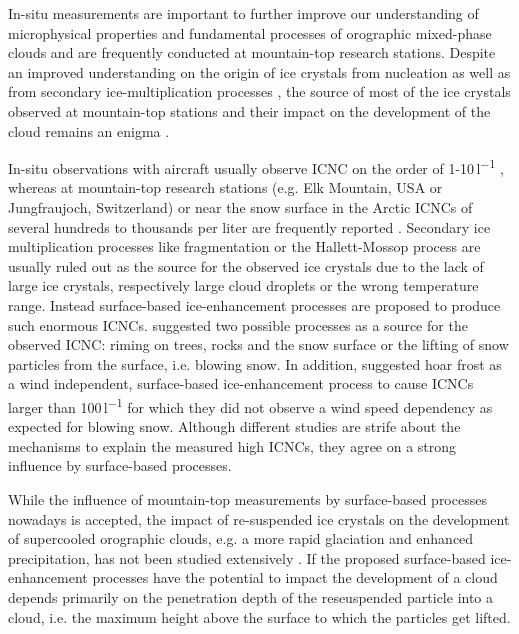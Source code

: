 \documentclass[draft,linenumbers]{agujournal}
\begin{document}
In-situ measurements are important to further improve our understanding of microphysical properties and fundamental processes of orographic mixed-phase clouds \citep{Bau10} and are frequently conducted at mountain-top research stations. Despite an improved understanding on the origin of ice crystals from nucleation \citep{Dem15, Bos16a} as well as from secondary ice-multiplication processes \citep{Fie17}, the source of most of the ice crystals observed at mountain-top stations and their impact on the development of the cloud remains an enigma \citep{Loh16}.
 
In-situ observations with aircraft usually observe ICNC on the order of 1-10\,\si{l^{-1}} \citep{Gul01}, whereas at mountain-top research stations (e.g. Elk Mountain, USA or Jungfraujoch, Switzerland) or near the snow surface in the Arctic ICNCs of several hundreds to thousands per liter are frequently reported \citep{Rog87, Lac01, Loy15}. Secondary ice multiplication processes like fragmentation \citep{Ran01} or the Hallett-Mossop process \citep{Hal74} are usually ruled out as the source for the observed ice crystals due to the lack of large ice crystals, respectively large cloud droplets or the wrong temperature range. Instead surface-based ice-enhancement processes are proposed to produce such enormous ICNCs. \citet{Rog87} suggested two possible processes as a source for the observed ICNC: riming on trees, rocks and the snow surface or the lifting of snow particles from the surface, i.e. blowing snow. In addition, \citet{Loy15} suggested hoar frost as a wind independent, surface-based ice-enhancement process to cause ICNCs larger than 100\,\si{l^{-1}} for which they did not observe a wind speed dependency as expected for blowing snow. Although different studies are strife about the mechanisms to explain the measured high ICNCs, they agree on a strong influence by surface-based processes. 

While the influence of mountain-top measurements by surface-based processes nowadays is accepted, the impact of re-suspended ice crystals on the development of supercooled orographic clouds, e.g. a more rapid glaciation and enhanced precipitation, has not been studied extensively \citep{Gee15}. If the proposed surface-based ice-enhancement processes have the potential to impact the development of a cloud depends primarily on the penetration depth of the reseuspended particle into a cloud, i.e. the maximum height above the surface to which the particles get lifted.   
\end{document}
